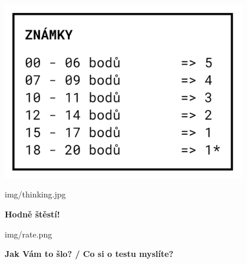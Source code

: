 \documentclass[aspectratio=1610]{beamer}
\begin{document}
\begin{frame}
    \begin{center}
        \includegraphics[width=0.8\textwidth]{img/test-1-hodnoceni.png}
    \end{center}
\end{frame}


\begin{frameImg}[width]{img/thinking.jpg}
    \vspace*{60mm}
    \begin{cardTiny}
        \vspace*{\fill}
        \begin{center}
            \textbf{Hodně štěstí!}
        \end{center}
    \end{cardTiny}
\end{frameImg}

\begin{frameImg}[width]{img/rate.png}
    \vspace*{60mm}
    \begin{cardTiny}
        \vspace*{\fill}
        \begin{center}
            \textbf{Jak Vám to šlo? / Co si o testu myslíte?}
        \end{center}
    \end{cardTiny}
\end{frameImg}
\end{document}
